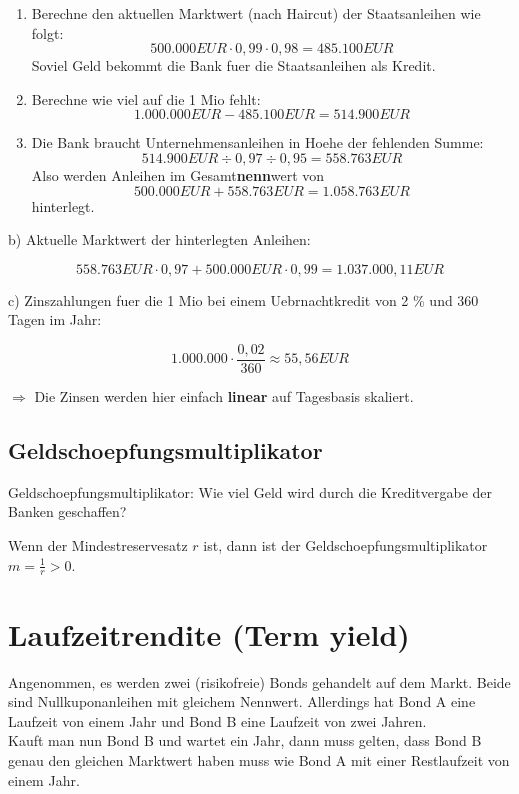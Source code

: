 \documentclass[a4paper]{article}
\begin{document}
\begin{enumerate}
	\item Berechne den aktuellen Marktwert (nach Haircut) der Staatsanleihen wie folgt:
	      \[
		      500.000 EUR \cdot 0,99 \cdot 0,98 = 485.100 EUR
	      \]
	      Soviel Geld bekommt die Bank fuer die Staatsanleihen als Kredit.
	\item Berechne wie viel auf die 1 Mio fehlt:
	      \[
		      1.000.000 EUR - 485.100 EUR = 514.900 EUR
	      \]
	\item Die Bank braucht Unternehmensanleihen in Hoehe der fehlenden Summe:
	      \[
		      514.900 EUR \div 0,97 \div 0,95 = 558.763 EUR
	      \]
	      Also werden Anleihen im Gesamt\textbf{nenn}wert von
	      \[
		      500.000 EUR + 558.763 EUR = 1.058.763 EUR
	      \]
	      hinterlegt.
\end{enumerate}

b) Aktuelle Marktwert der hinterlegten Anleihen:

\[
	558.763 EUR \cdot 0,97 + 500.000 EUR \cdot 0,99 = 1.037.000,11 EUR
\]

c) Zinszahlungen fuer die 1 Mio bei einem Uebrnachtkredit von 2 \% und 360 Tagen
im Jahr:

\[
	1.000.000 \cdot \frac{ 0,02 }{ 360 } \approx 55,56 EUR
\]

$\Rightarrow$ Die Zinsen werden hier einfach \textbf{linear} auf Tagesbasis skaliert.

\subsection{Geldschoepfungsmultiplikator}

Geldschoepfungsmultiplikator: Wie viel Geld wird durch die
Kreditvergabe der Banken geschaffen?

Wenn der Mindestreservesatz $r$ ist, dann ist der Geldschoepfungsmultiplikator $m = \frac{1}{r} > 0$.

\section{Laufzeitrendite (Term yield)}

Angenommen, es werden zwei (risikofreie) Bonds gehandelt auf dem Markt. Beide sind
Nullkuponanleihen mit gleichem Nennwert. Allerdings hat Bond A eine Laufzeit von
einem Jahr und Bond B eine Laufzeit von zwei Jahren. \\

Kauft man nun Bond B und wartet ein Jahr, dann muss gelten, dass Bond B genau
den gleichen Marktwert haben muss wie Bond A mit einer Restlaufzeit von einem Jahr.
\end{document}

